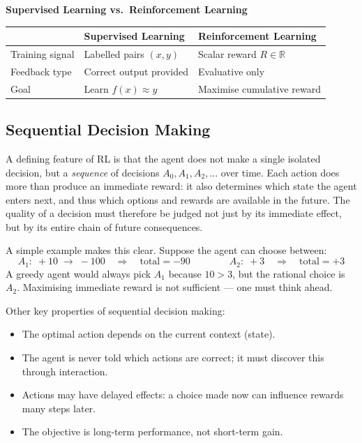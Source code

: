 \documentclass[11pt,a4paper]{article}
\newcommand{\R}{\mathbb{R}}
\begin{document}
\begin{tcolorbox}[colback=LightBlue,colframe=AccentBlue,boxrule=0.8pt,arc=3pt]
\textbf{Supervised Learning vs.\ Reinforcement Learning}\\[6pt]
\begin{tabular}{@{}lll@{}}
\toprule
 & \textbf{Supervised Learning} & \textbf{Reinforcement Learning} \\
\midrule
Training signal & Labelled pairs $(x, y)$ & Scalar reward $R \in \R$ \\
Feedback type & Correct output provided & Evaluative only \\
Goal & Learn $f(x)\approx y$ & Maximise cumulative reward \\
\bottomrule
\end{tabular}
\end{tcolorbox}

\subsection{Sequential Decision Making}

A defining feature of RL is that the agent does not make a single isolated decision, but a \emph{sequence} of decisions $A_0, A_1, A_2, \ldots$ over time. Each action does more than produce an immediate reward: it also determines which state the agent enters next, and thus which options and rewards are available in the future. The quality of a decision must therefore be judged not just by its immediate effect, but by its entire chain of future consequences.

A simple example makes this clear. Suppose the agent can choose between:
\[
A_1:\; +10 \;\to\; -100 \quad\Rightarrow\quad \text{total} = -90 \qquad\qquad A_2:\; +3 \quad\Rightarrow\quad \text{total} = +3
\]
A greedy agent would always pick $A_1$ because $10 > 3$, but the rational choice is $A_2$. Maximising immediate reward is not sufficient --- one must think ahead.

Other key properties of sequential decision making:
\begin{itemize}
  \item The optimal action depends on the current context (state).
  \item The agent is never told which actions are correct; it must discover this through interaction.
  \item Actions may have delayed effects: a choice made now can influence rewards many steps later.
  \item The objective is long-term performance, not short-term gain.
\end{itemize}
\end{document}
